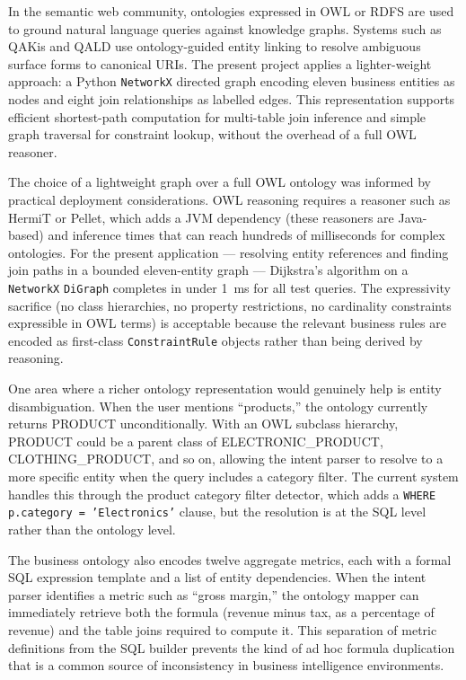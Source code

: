 \documentclass[12pt,a4paper]{report}
\begin{document}
In the semantic web community, ontologies expressed in OWL or RDFS are used to ground natural language queries against knowledge graphs. Systems such as QAKis and QALD use ontology-guided entity linking to resolve ambiguous surface forms to canonical URIs. The present project applies a lighter-weight approach: a Python \texttt{NetworkX} \cite{networkx} directed graph encoding eleven business entities as nodes and eight join relationships as labelled edges. This representation supports efficient shortest-path computation for multi-table join inference and simple graph traversal for constraint lookup, without the overhead of a full OWL reasoner.

The choice of a lightweight graph over a full OWL ontology was informed by practical deployment considerations. OWL reasoning requires a reasoner such as HermiT or Pellet, which adds a JVM dependency (these reasoners are Java-based) and inference times that can reach hundreds of milliseconds for complex ontologies. For the present application — resolving entity references and finding join paths in a bounded eleven-entity graph — Dijkstra's algorithm on a \texttt{NetworkX} \texttt{DiGraph} completes in under 1~ms for all test queries. The expressivity sacrifice (no class hierarchies, no property restrictions, no cardinality constraints expressible in OWL terms) is acceptable because the relevant business rules are encoded as first-class \texttt{ConstraintRule} objects rather than being derived by reasoning.

One area where a richer ontology representation would genuinely help is entity disambiguation. When the user mentions ``products,'' the ontology currently returns PRODUCT unconditionally. With an OWL subclass hierarchy, PRODUCT could be a parent class of ELECTRONIC\_PRODUCT, CLOTHING\_PRODUCT, and so on, allowing the intent parser to resolve to a more specific entity when the query includes a category filter. The current system handles this through the product category filter detector, which adds a \texttt{WHERE p.category = 'Electronics'} clause, but the resolution is at the SQL level rather than the ontology level.

The business ontology also encodes twelve aggregate metrics, each with a formal SQL expression template and a list of entity dependencies. When the intent parser identifies a metric such as ``gross margin,'' the ontology mapper can immediately retrieve both the formula (revenue minus tax, as a percentage of revenue) and the table joins required to compute it. This separation of metric definitions from the SQL builder prevents the kind of ad hoc formula duplication that is a common source of inconsistency in business intelligence environments.
\end{document}
